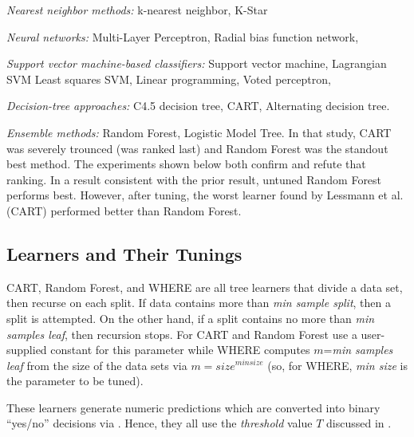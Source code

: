 \item
{\em Nearest neighbor methods:}
k-nearest neighbor,
K-Star

\item
{\em Neural networks:}
Multi-Layer Perceptron,
Radial bias function network,

\item
{\em Support vector machine-based classifiers:}
Support vector machine,
Lagrangian SVM
Least squares SVM,
Linear programming,
Voted perceptron,

\item
{\em Decision-tree approaches:}
C4.5 decision tree,
CART,
Alternating decision tree.
\item
{\em Ensemble methods:}
Random Forest,
Logistic Model Tree.
\ei
In that study, CART was severely trounced (was ranked last) and Random Forest was
the standout best method. The experiments shown below both confirm and refute
that ranking. In a result consistent with the prior result, untuned Random Forest performs best.
However, after tuning, the worst learner found by Lessmann et al. (CART) performed better
than Random Forest.
  

\subsection{Learners and Their Tunings}

CART, Random Forest, and WHERE are all  tree learners that divide a data set, then recurse
on each split.
If data contains more than {\em min sample split}, then a split is attempted.
On the other hand, if a split contains no more than {\em min samples leaf}, then recursion stops. For CART and Random Forest use a 
user-supplied constant for this parameter while
WHERE computes $m$={\em min samples leaf} from the size of the data
sets via  $m=\mathit{size}^\mathit{min size}$ (so, for WHERE,
{\em min size} is the parameter to be tuned).

These learners
generate numeric predictions which are converted
into binary ``yes/no'' decisions via . Hence, they all use the {\em threshold} value $T$ discussed in .

